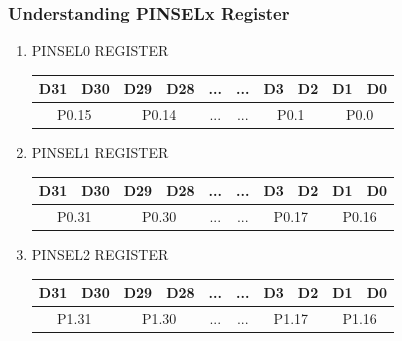 \documentclass[10pt,red]{beamer}
\begin{document}
\begin{frame}
	\frametitle{Understanding PINSELx Register} \pause
	\begin{enumerate}
	\item<+-|alert@+> \color{red}PINSEL0 REGISTER\\[10pt] \color{black}
	\begin{tabular}{|c|c|c|c|c|c|c|c|c|c|}
		\hline D31 & D30 & D29 & D28 & ... & ... & D3 & D2 & D1 & D0 \\ 
		\hline
		\multicolumn{2}{|c|}{P0.15} & \multicolumn{2}{c|}{P0.14}& ... & ... & \multicolumn{2}{c|}{P0.1}  & \multicolumn{2}{c|}{P0.0}  \\ 
		\hline 
	\end{tabular}  	\pause
	\item<+-|alert@+> \color{red}PINSEL1 REGISTER\\[10pt] \color{black}
	\begin{tabular}{|c|c|c|c|c|c|c|c|c|c|}
		\hline D31 & D30 & D29 & D28 & ... & ... & D3 & D2 & D1 & D0 \\ 
		\hline
		\multicolumn{2}{|c|}{P0.31} & \multicolumn{2}{c|}{P0.30}& ... & ... & \multicolumn{2}{c|}{P0.17}  & \multicolumn{2}{c|}{P0.16}  \\ 
		\hline 
	\end{tabular} 	\pause
	\item<+-|alert@+> \color{red}PINSEL2 REGISTER\\[10pt] \color{black}
	\begin{tabular}{|c|c|c|c|c|c|c|c|c|c|}
		\hline D31 & D30 & D29 & D28 & ... & ... & D3 & D2 & D1 & D0 \\ 
		\hline
		\multicolumn{2}{|c|}{P1.31} & \multicolumn{2}{c|}{P1.30}& ... & ... & \multicolumn{2}{c|}{P1.17}  & \multicolumn{2}{c|}{P1.16}  \\ 
		\hline 
	\end{tabular} \pause	
	\end{enumerate}			
\end{frame}
\end{document}
